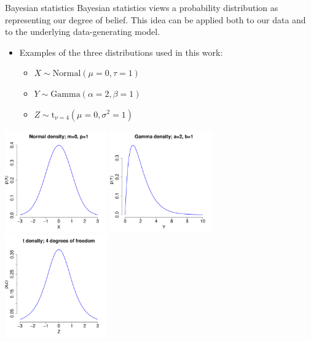 \documentclass{beamer}
\begin{document}
\begin{frame}{Bayesian statistics}
	Bayesian statistics views a probability distribution as representing our degree of belief. This idea can be applied both to our data and to the underlying data-generating model.\\
	\vspace{3mm}
	\begin{itemize}
		\item Examples of the three distributions used in this work:
		\begin{itemize}
			\item $X \sim \text{Normal}(\mu=0, \tau=1)$
			\item $Y \sim \text{Gamma}(\alpha=2, \beta=1)$
			\item $Z \sim \text{t}_{\nu=4}(\mu=0, \sigma^2=1)$
		\end{itemize}
	\end{itemize}
	\begin{center}
		\includegraphics[width=0.33\textwidth]{../../figures/normal_pdf}
		\includegraphics[width=0.33\textwidth]{../../figures/gamma_pdf}
		\includegraphics[width=0.33\textwidth]{../../figures/t_pdf}
	\end{center}
\end{frame}
\end{document}
